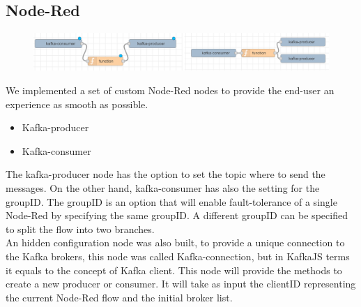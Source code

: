 \documentclass[a4paper, 12pt]{extarticle}
\begin{document}
\subsection{Node-Red}\label{node-red}
\begin{figure}[h]
    \centering
    \includegraphics[width=\textwidth]{images/flows.PNG}
    \label{fig:flows}
\end{figure}
We implemented a set of custom Node-Red nodes to provide the end-user an experience as smooth as possible. 
\begin{itemize}
    \item Kafka-producer
    \item Kafka-consumer 
\end{itemize}
The kafka-producer node has the option to set the topic where to send the messages.
On the other hand, kafka-consumer has also the setting for the groupID. The groupID is an option that will enable fault-tolerance of a single Node-Red by specifying the same groupID. A different groupID can be specified to split the flow into two branches.\\
An hidden configuration node was also built, to provide a unique connection to the Kafka brokers, this node was called Kafka-connection, but in KafkaJS terms it equals to the concept of Kafka client.
This node will provide the methods to create a new producer or consumer. It will take as input the clientID representing the current Node-Red flow and the initial broker list. 

\newpage
\end{document}
